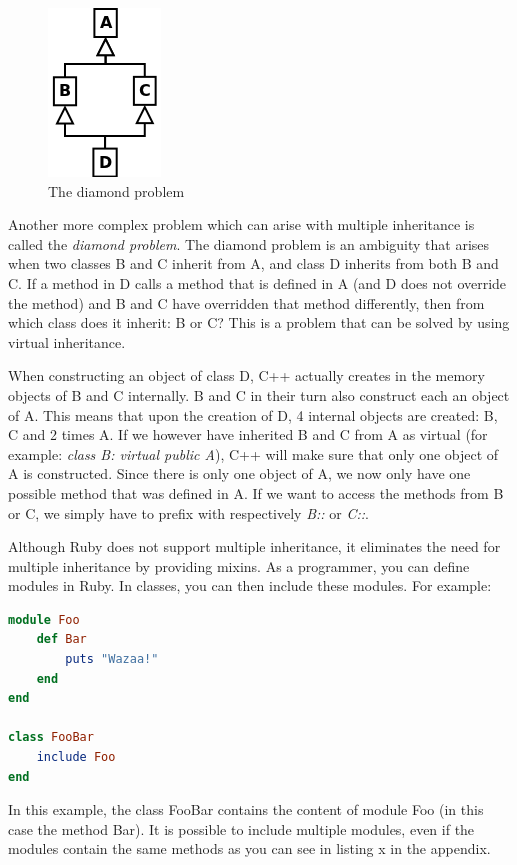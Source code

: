 \documentclass[10pt,a4paper,twocolumn]{article}
\begin{document}
\begin{figure}
\caption{The diamond problem}
\begin{center}
\includegraphics[scale=0.6]{diamond.png}
\end{center}
\end{figure}

Another more complex problem which can arise with multiple inheritance is called the \textit{diamond problem}. The diamond problem is an ambiguity that arises when two classes B and C inherit from A, and class D inherits from both B and C. If a method in D calls a method that is defined in A (and D does not override the method) and B and C have overridden that method differently, then from which class does it inherit: B or C? This is a problem that can be solved by using virtual inheritance.

When constructing an object of class D, C++ actually creates in the memory objects of B and C internally. B and C in their turn also construct each an object of A. This means that upon the creation of D, 4 internal objects are created: B, C and 2 times A. If we however have inherited B and C from A as virtual (for example: \textit{class B: virtual public A}), C++ will make sure that only one object of A is constructed. Since there is only one object of A, we now only have one possible method that was defined in A. If we want to access the methods from B or C, we simply have to prefix with respectively \textit{B::} or \textit{C::}.

Although Ruby does not support multiple inheritance, it eliminates the need for multiple inheritance by providing mixins. As a programmer, you can define modules in Ruby. In classes, you can then include these modules. For example:

\begin{lstlisting}[language=Ruby]
module Foo
	def Bar
		puts "Wazaa!"
	end
end

class FooBar
	include Foo
end
\end{lstlisting}

In this example, the class FooBar contains the content of module Foo (in this case the method Bar). It is possible to include multiple modules, even if the modules contain the same methods as you can see in listing x in the appendix.
\end{document}
